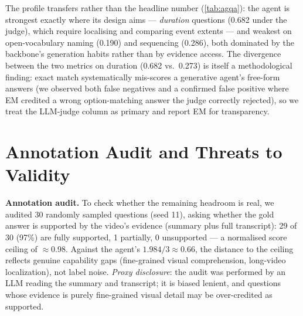The profile transfers rather than the headline number
(\cref{tab:agqa}): the agent is strongest exactly where its design aims ---
\emph{duration} questions (0.682 under the judge), which require localising and
comparing event extents --- and weakest on open-vocabulary naming (0.190) and
sequencing (0.286), both dominated by the backbone's generation habits rather than
by evidence access. The divergence between the two metrics on duration (0.682 vs.\
0.273) is itself a methodological finding: exact match systematically
mis-scores a generative agent's free-form answers (we observed both false
negatives and a confirmed false positive where EM credited a wrong option-matching
answer the judge correctly rejected), so we treat the LLM-judge column as primary
and report EM for transparency.

\section{Annotation Audit and Threats to Validity}
\label{sec:threats}

\textbf{Annotation audit.} To check whether the remaining headroom is real, we
audited 30 randomly sampled questions (seed 11), asking whether the gold answer is
supported by the video's evidence (summary plus full transcript): 29 of 30 (97\%)
are fully supported, 1 partially, 0 unsupported --- a normalised score ceiling of
$\approx$0.98. Against the agent's $1.984/3 \approx 0.66$, the distance to the
ceiling reflects genuine capability gaps (fine-grained visual comprehension,
long-video localization), not label noise. \emph{Proxy disclosure}: the audit was
performed by an LLM reading the summary and transcript; it is biased lenient, and
questions whose evidence is purely fine-grained visual detail may be over-credited
as supported.

